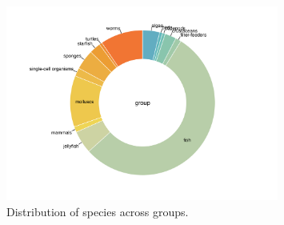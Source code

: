 \documentclass[10pt]{article}
\begin{document}
\begin{figure}[h]
\centering
\includegraphics[width=0.8\textwidth]{donut.png}
\caption{Distribution of species across groups.}
\end{figure}





\clearpage

\begin{landscape}

\end{landscape}

\clearpage

\end{document}
